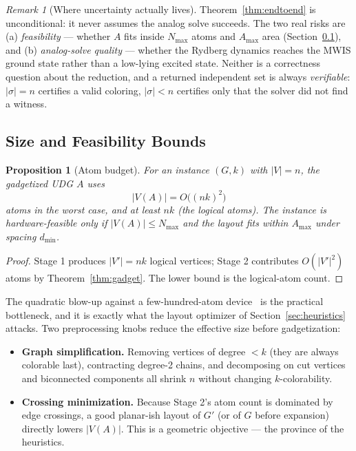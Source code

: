 \documentclass[11pt]{article}
\newtheorem{proposition}[theorem]{Proposition}
\theoremstyle{definition}
\theoremstyle{remark}
\newtheorem{remark}[theorem]{Remark}
\begin{document}
\begin{remark}[Where uncertainty actually lives]
Theorem~\ref{thm:endtoend} is unconditional: it never assumes the analog solve
succeeds. The two real risks are (a) \emph{feasibility} --- whether $A$ fits inside
$N_{\max}$ atoms and $A_{\max}$ area (Section~\ref{sec:size}), and (b)
\emph{analog-solve quality} --- whether the Rydberg dynamics reaches the MWIS
ground state rather than a low-lying excited state. Neither is a correctness
question about the reduction, and a returned independent set is always
\emph{verifiable}: $|\sigma|=n$ certifies a valid coloring, $|\sigma|<n$ certifies
only that the solver did not find a witness.
\end{remark}

\subsection{Size and Feasibility Bounds}
\label{sec:size}

\begin{proposition}[Atom budget]
\label{prop:atombudget}
For an instance $(G,k)$ with $|V|=n$, the gadgetized UDG $A$ uses
\[
  |V(A)| = O\!\bigl((nk)^2\bigr)
\]
atoms in the worst case, and at least $nk$ (the logical atoms). The instance is
hardware-feasible only if $|V(A)|\le N_{\max}$ and the layout fits within
$A_{\max}$ under spacing $d_{\min}$.
\end{proposition}

\begin{proof}
Stage 1 produces $|V'|=nk$ logical vertices; Stage 2 contributes
$O(|V'|^2)$ atoms by Theorem~\ref{thm:gadget}. The lower bound is the logical-atom
count.
\end{proof}

The quadratic blow-up against a few-hundred-atom device~\cite{Wurtz2023} is the
practical bottleneck, and it is exactly what the layout optimizer of
Section~\ref{sec:heuristics} attacks. Two preprocessing knobs reduce the effective
size before gadgetization:
\begin{itemize}[leftmargin=1.4em]
  \item \textbf{Graph simplification.} Removing vertices of degree $<k$ (they are
        always colorable last), contracting degree-2 chains, and decomposing on
        cut vertices and biconnected components all shrink $n$ without changing
        $k$-colorability.
  \item \textbf{Crossing minimization.} Because Stage 2's atom count is dominated
        by edge crossings, a good planar-ish layout of $G'$ (or of $G$ before
        expansion) directly lowers $|V(A)|$. This is a geometric objective --- the
        province of the heuristics.
\end{itemize}
\end{document}
